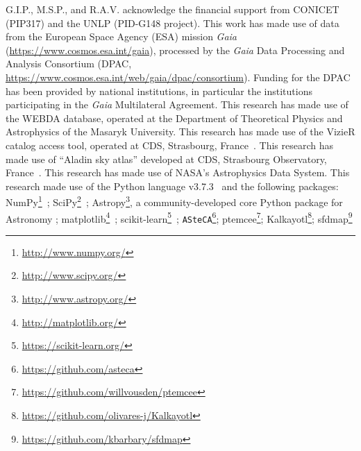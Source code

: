 \documentclass[draft]{aa}
\begin{document}
\begin{acknowledgements}
G.I.P., M.S.P., and R.A.V. acknowledge the financial support from CONICET 
(PIP317) and the UNLP (PID-G148 project).
%
This work has made use of data from the European Space Agency (ESA) mission
{\it Gaia} (\url{https://www.cosmos.esa.int/gaia}), processed by the {\it Gaia}
Data Processing and Analysis Consortium (DPAC,
\url{https://www.cosmos.esa.int/web/gaia/dpac/consortium}). Funding for the DPAC
has been provided by national institutions, in particular the institutions
participating in the {\it Gaia} Multilateral Agreement.
%
This research has made use of the WEBDA database, operated at the Department of
Theoretical Physics and Astrophysics of the Masaryk University.
%
This research has made use of the VizieR catalog access tool, operated at CDS,
Strasbourg, France~\citep{Ochsenbein_2000}.
%
This research has made use of ``Aladin sky atlas'' developed at
CDS, Strasbourg Observatory, France~\citep{Bonnarel2000,Boch2014}.
%
This research has made use of NASA's Astrophysics Data System.
%
This research made use of the Python language v3.7.3~\citep{vanRossum_1995}
and the following packages:
NumPy\footnote{\url{http://www.numpy.org/}}~\citep{vanDerWalt_2011};
SciPy\footnote{\url{http://www.scipy.org/}}~\citep{Jones_2001};
Astropy\footnote{\url{http://www.astropy.org/}}, a community-developed core
Python package for Astronomy \citep{astropy:2013, astropy:2018};
matplotlib\footnote{\url{http://matplotlib.org/}}~\citep{hunter_2007};
scikit-learn\footnote{\url{https://scikit-learn.org/}}~\citep{scikit-learn};
\texttt{ASteCA}\footnote{\url{https://github.com/asteca}};
ptemcee\footnote{\url{https://github.com/willvousden/ptemcee}};
Kalkayotl\footnote{\url{https://github.com/olivares-j/Kalkayotl}};
sfdmap\footnote{\url{https://github.com/kbarbary/sfdmap}}
\end{acknowledgements}





\end{document}

